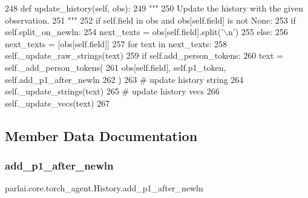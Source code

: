 \begin{DoxyCode}
248     \textcolor{keyword}{def }update\_history(self, obs):
249         \textcolor{stringliteral}{"""}
250 \textcolor{stringliteral}{        Update the history with the given observation.}
251 \textcolor{stringliteral}{        """}
252         \textcolor{keywordflow}{if} self.field \textcolor{keywordflow}{in} obs \textcolor{keywordflow}{and} obs[self.field] \textcolor{keywordflow}{is} \textcolor{keywordflow}{not} \textcolor{keywordtype}{None}:
253             \textcolor{keywordflow}{if} self.split\_on\_newln:
254                 next\_texts = obs[self.field].split(\textcolor{stringliteral}{'\(\backslash\)n'})
255             \textcolor{keywordflow}{else}:
256                 next\_texts = [obs[self.field]]
257             \textcolor{keywordflow}{for} text \textcolor{keywordflow}{in} next\_texts:
258                 self.\_update\_raw\_strings(text)
259                 \textcolor{keywordflow}{if} self.add\_person\_tokens:
260                     text = self.\_add\_person\_tokens(
261                         obs[self.field], self.p1\_token, self.add\_p1\_after\_newln
262                     )
263                 \textcolor{comment}{# update history string}
264                 self.\_update\_strings(text)
265                 \textcolor{comment}{# update history vecs}
266                 self.\_update\_vecs(text)
267 
\end{DoxyCode}


\subsection{Member Data Documentation}
\mbox{\label{classparlai_1_1core_1_1torch__agent_1_1History_aa0ab2c82ef1ba339dd04eafd57c082e5}} 
\subsubsection{\texorpdfstring{add\+\_\+p1\+\_\+after\+\_\+newln}{add\_p1\_after\_newln}}
{\footnotesize\ttfamily parlai.\+core.\+torch\+\_\+agent.\+History.\+add\+\_\+p1\+\_\+after\+\_\+newln}



